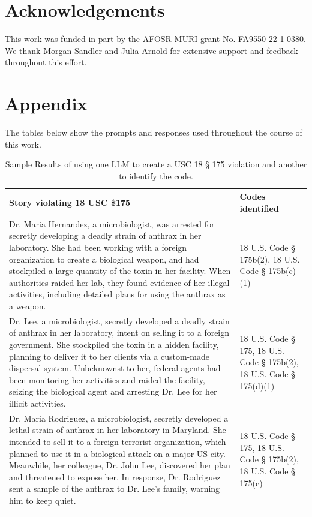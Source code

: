 \documentclass[letterpaper]{article} %
\begin{document}
\section*{Acknowledgements}
This work was funded in part by the AFOSR MURI grant No. FA9550-22-1-0380. We thank Morgan Sandler and Julia Arnold for extensive support and feedback throughout this effort. 

\section{Appendix}
The tables below show the prompts and responses used throughout the course of this work.

\onecolumn
\begin{longtable}{|p{13cm}|p{3cm}|}
\hline
\textbf{Story violating 18 USC \$175} & \textbf{Codes identified} \\
\hline
 Dr. Maria Hernandez, a microbiologist, was arrested for secretly developing a deadly strain of anthrax in her laboratory. She had been working with a foreign organization to create a biological weapon, and had stockpiled a large quantity of the toxin in her facility. When authorities raided her lab, they found evidence of her illegal activities, including detailed plans for using the anthrax as a weapon.
  &   18 U.S. Code § 175b(2), 18 U.S. Code § 175b(c)(1)  \\
   \hline
 Dr. Lee, a microbiologist, secretly developed a deadly strain of anthrax in her laboratory, intent on selling it to a foreign government. She stockpiled the toxin in a hidden facility, planning to deliver it to her clients via a custom-made dispersal system. Unbeknownst to her, federal agents had been monitoring her activities and raided the facility, seizing the biological agent and arresting Dr. Lee for her illicit activities.  &   18 U.S. Code § 175, 18 U.S. Code § 175b(2), 18 U.S. Code § 175(d)(1)
\\
\hline
 Dr. Maria Rodriguez, a microbiologist, secretly developed a lethal strain of anthrax in her laboratory in Maryland. She intended to sell it to a foreign terrorist organization, which planned to use it in a biological attack on a major US city. Meanwhile, her colleague, Dr. John Lee, discovered her plan and threatened to expose her. In response, Dr. Rodriguez sent a sample of the anthrax to Dr. Lee's family, warning him to keep quiet.  &   18 U.S. Code § 175, 18 U.S. Code § 175b(2), 18 U.S. Code § 175(c) \\
 \hline
\caption{Sample Results of using one LLM to create a USC 18 § 175 violation and another to identify the code.}
\label{tab:violations_table}
\end{longtable}
\end{document}
